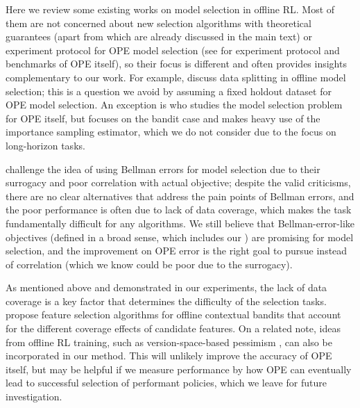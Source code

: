 Here we review some existing works on model selection in offline RL. Most of them are not concerned about new selection algorithms with theoretical guarantees (apart from \cite{xie2020batch, zhang2021towards, zitovsky2023revisiting, liu2023offline} which are already discussed in the main text) or experiment protocol for OPE model selection (see \cite{voloshin2019empirical, kiyohara2023scope} for experiment protocol and benchmarks of OPE itself), so their focus is different and often provides insights complementary to our work. For example, \cite{nie2022data} discuss data splitting in offline model selection; this is a question we avoid by assuming a fixed holdout dataset for OPE model selection. An exception is \cite{udagawa2023policy} who studies the model selection problem for OPE itself, but focuses on the bandit case and makes heavy use of the importance sampling estimator, which we do not consider due to the focus on long-horizon tasks. 

\cite{fujimoto2022should} challenge the idea of using Bellman errors for model selection due to their surrogacy and poor correlation with actual objective; despite the valid criticisms, there are no clear alternatives that address the pain points of Bellman errors, and the poor performance is often due to lack of data coverage, which makes the task fundamentally difficult for any algorithms. We still believe that Bellman-error-like objectives (defined in a broad sense, which includes our \lstd) are promising for model selection, and the improvement on OPE error is the right goal to pursue instead of correlation (which we know could be poor due to the surrogacy). 

As mentioned above and demonstrated in our experiments, the lack of data coverage is a key factor that determines the difficulty of the selection tasks. \cite{lee2022model} propose  feature selection algorithms for offline contextual bandits that account for the different coverage effects of candidate features. On a related note, ideas from offline RL training, such as version-space-based pessimism \cite{xie2021bellman}, can also be incorporated in our method. This will unlikely improve the accuracy of OPE itself, but may be helpful if we measure performance by how OPE can eventually lead to successful selection of performant policies, which we leave for future investigation. 